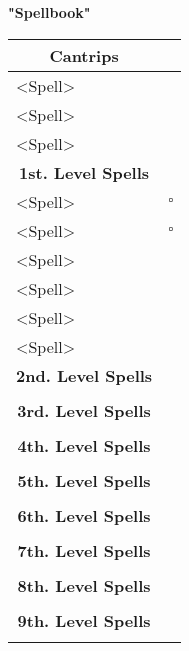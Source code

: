 \documentclass[11pt]{article}
\newcommand{\done}{\rlap{$\square$}{\raisebox{2pt}{\large\hspace{1pt}\ding{51}}}}
\newcommand{\available}{$\square$}
\begin{document}
\clearpage

	\begin{center}
{\LARGE \textbf{"Spellbook"}}
	\end{center}

	\begin{tabularx}{\textwidth}{X|r}
\multicolumn{1}{c|}{\large \textbf{Cantrips}} & \\
\hline
<Spell> 										& 	\\
<Spell> 										& 	\\
<Spell>		 									&	\\

\multicolumn{1}{c|}{\large \textbf{1st. Level Spells}} & \\
\hline
<Spell>			 								& \available \\
<Spell> 										& \available \\
<Spell>											& \done \\
<Spell> 										& \done \\
<Spell>				 							& \done \\
<Spell> 										& \done \\

\multicolumn{1}{c|}{\large \textbf{2nd. Level Spells}} &	\\
\hline
												&	\\

\multicolumn{1}{c|}{\large \textbf{3rd. Level Spells}} & \\
\hline
 												&  	\\

\multicolumn{1}{c|}{\large \textbf{4th. Level Spells}} & \\
\hline
 												&  	\\

\multicolumn{1}{c|}{\large \textbf{5th. Level Spells}} & \\
\hline
	 											&  	\\

\multicolumn{1}{c|}{\large \textbf{6th. Level Spells}} & \\
\hline
	 											&  	\\

\multicolumn{1}{c|}{\large \textbf{7th. Level Spells}} & \\
\hline
	 											&  	\\

\multicolumn{1}{c|}{\large \textbf{8th. Level Spells}} & \\
\hline
	 											&  	\\

\multicolumn{1}{c|}{\large \textbf{9th. Level Spells}} & \\
\hline
	 											&
	\end{tabularx}
\end{document}
